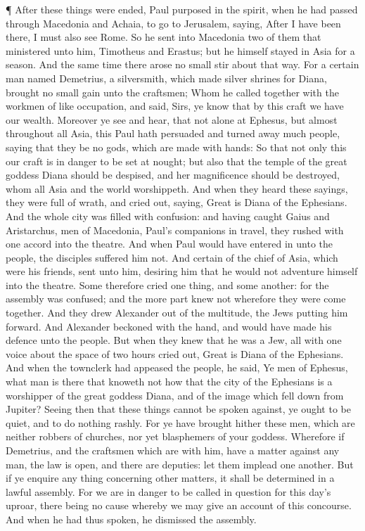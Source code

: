  ¶ After these things were ended, Paul purposed in the
spirit, when he had passed through Macedonia and Achaia, to go to
Jerusalem, saying, After I have been there, I must also see Rome.
 So he sent into Macedonia two of them that ministered unto
him, Timotheus and Erastus; but he himself stayed in Asia for a season.
 And the same time there arose no small stir about that
way.  For a certain man named Demetrius, a silversmith,
which made silver shrines for Diana, brought no small gain unto the
craftsmen;  Whom he called together with the workmen of
like occupation, and said, Sirs, ye know that by this craft we have our
wealth.  Moreover ye see and hear, that not alone at
Ephesus, but almost throughout all Asia, this Paul hath persuaded and
turned away much people, saying that they be no gods, which are made
with hands:  So that not only this our craft is in danger
to be set at nought; but also that the temple of the great goddess Diana
should be despised, and her magnificence should be destroyed, whom all
Asia and the world worshippeth.  And when they heard these
sayings, they were full of wrath, and cried out, saying, Great is Diana
of the Ephesians.  And the whole city was filled with
confusion: and having caught Gaius and Aristarchus, men of Macedonia,
Paul's companions in travel, they rushed with one accord into the
theatre.  And when Paul would have entered in unto the
people, the disciples suffered him not.  And certain of the
chief of Asia, which were his friends, sent unto him, desiring him that
he would not adventure himself into the theatre.  Some
therefore cried one thing, and some another: for the assembly was
confused; and the more part knew not wherefore they were come together.
 And they drew Alexander out of the multitude, the Jews
putting him forward. And Alexander beckoned with the hand, and would
have made his defence unto the people.  But when they knew
that he was a Jew, all with one voice about the space of two hours cried
out, Great is Diana of the Ephesians.  And when the
townclerk had appeased the people, he said, Ye men of Ephesus, what man
is there that knoweth not how that the city of the Ephesians is a
worshipper of the great goddess Diana, and of the image which fell down
from Jupiter?  Seeing then that these things cannot be
spoken against, ye ought to be quiet, and to do nothing rashly.
 For ye have brought hither these men, which are neither
robbers of churches, nor yet blasphemers of your goddess. 
Wherefore if Demetrius, and the craftsmen which are with him, have a
matter against any man, the law is open, and there are deputies: let
them implead one another.  But if ye enquire any thing
concerning other matters, it shall be determined in a lawful assembly.
 For we are in danger to be called in question for this
day's uproar, there being no cause whereby we may give an account of
this concourse.  And when he had thus spoken, he dismissed
the assembly.

